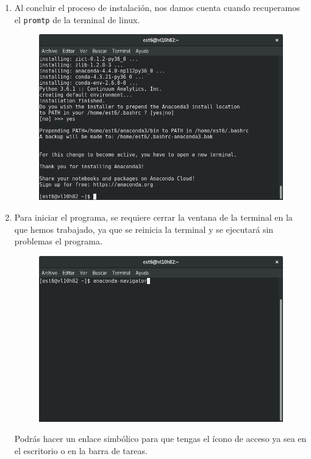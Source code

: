 \documentclass[12pt]{article}
\begin{document}
\begin{enumerate}
\begin{figure}[H]
\end{figure}
\item Al concluir el proceso de instalación, nos damos cuenta cuando recuperamos el \texttt{promtp} de la terminal de linux.
\begin{figure}[H]
 	\centering
 	\includegraphics[scale=0.35]{Imagenes/Instalacion_Anaconda_01_linux_10}
\end{figure}
\item Para iniciar el programa, se requiere cerrar la ventana de la terminal en la que hemos trabajado, ya que se reinicia la terminal y se ejecutará sin problemas el programa.
\begin{figure}[H]
 	\centering
 	\includegraphics[scale=0.35]{Imagenes/Instalacion_Anaconda_01_linux_11}
\end{figure}
Podrás hacer un enlace simbólico para que tengas el ícono de acceso ya sea en el escritorio o en la barra de tareas.

\end{enumerate}
\end{document}
